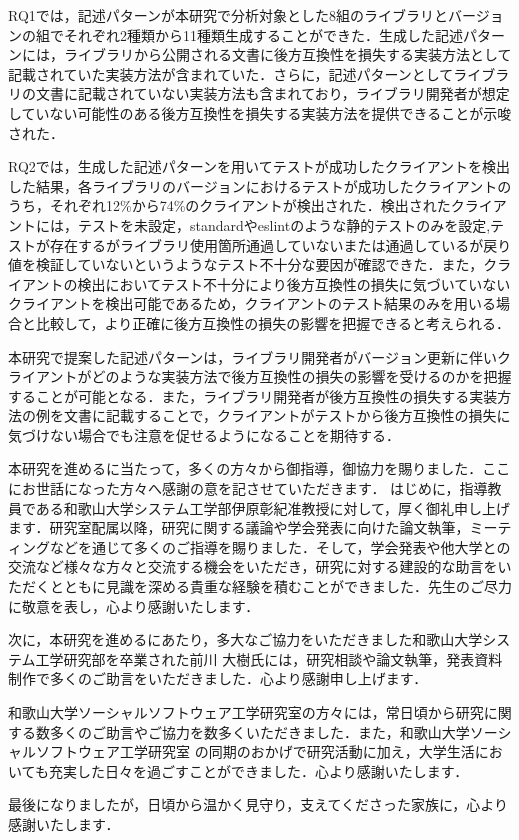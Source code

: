 \documentclass[11pt]{jreport}
\begin{document}
RQ1では，記述パターンが本研究で分析対象とした8組のライブラリとバージョンの組でそれぞれ2種類から11種類生成することができた．生成した記述パターンには，ライブラリから公開される文書に後方互換性を損失する実装方法として記載されていた実装方法が含まれていた．さらに，記述パターンとしてライブラリの文書に記載されていない実装方法も含まれており，ライブラリ開発者が想定していない可能性のある後方互換性を損失する実装方法を提供できることが示唆された．

RQ2では，生成した記述パターンを用いてテストが成功したクライアントを検出した結果，各ライブラリのバージョンにおけるテストが成功したクライアントのうち，それぞれ12\%から74\%のクライアントが検出された．検出されたクライアントには，テストを未設定，standardやeslintのような静的テストのみを設定,テストが存在するがライブラリ使用箇所通過していないまたは通過しているが戻り値を検証していないというようなテスト不十分な要因が確認できた．また，クライアントの検出においてテスト不十分により後方互換性の損失に気づいていないクライアントを検出可能であるため，クライアントのテスト結果のみを用いる場合と比較して，より正確に後方互換性の損失の影響を把握できると考えられる．

本研究で提案した記述パターンは，ライブラリ開発者がバージョン更新に伴いクライアントがどのような実装方法で後方互換性の損失の影響を受けるのかを把握することが可能となる．また，ライブラリ開発者が後方互換性の損失する実装方法の例を文書に記載することで，クライアントがテストから後方互換性の損失に気づけない場合でも注意を促せるようになることを期待する．


\begin{acknowledgements}
本研究を進めるに当たって，多くの方々から御指導，御協力を賜りました．ここにお世話になった方々へ感謝の意を記させていただきます．
はじめに，指導教員である和歌山大学システム工学部伊原彰紀准教授に対して，厚く御礼申し上げます．研究室配属以降，研究に関する議論や学会発表に向けた論文執筆，ミーティングなどを通じて多くのご指導を賜りました．そして，学会発表や他大学との交流など様々な方々と交流する機会をいただき，研究に対する建設的な助言をいただくとともに見識を深める貴重な経験を積むことができました．先生のご尽力に敬意を表し，心より感謝いたします．

次に，本研究を進めるにあたり，多大なご協力をいただきました和歌山大学システム工学研究部を卒業された前川 大樹氏には，研究相談や論文執筆，発表資料制作で多くのご助言をいただきました．心より感謝申し上げます．

和歌山大学ソーシャルソフトウェア工学研究室の方々には，常日頃から研究に関する数多くのご助言やご協力を数多くいただきました．また，和歌山大学ソーシャルソフトウェア工学研究室
の同期のおかげで研究活動に加え，大学生活においても充実した日々を過ごすことができました．心より感謝いたします．

最後になりましたが，日頃から温かく見守り，支えてくださった家族に，心より感謝いたします．




\end{acknowledgements}
\end{document}
